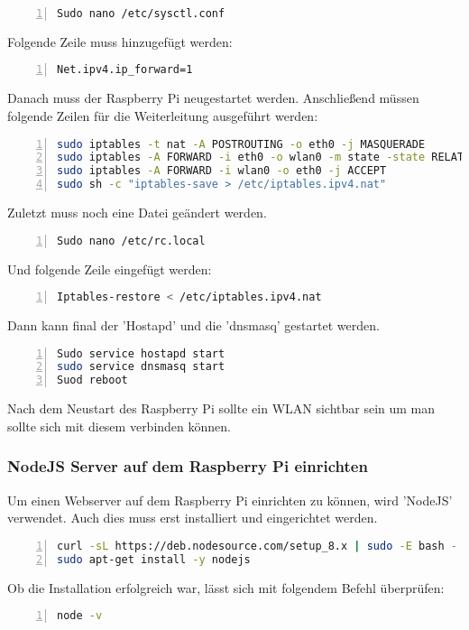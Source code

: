 \begin{lstlisting}[caption={Konfiguration IPV4 Schritt 1}, language={bash}, numbers=left]
Sudo nano /etc/sysctl.conf
\end{lstlisting}
Folgende Zeile muss hinzugefügt werden:
\begin{lstlisting}[caption={Konfiguration IPV4 Schritt 2}, language={bash}, numbers=left]
Net.ipv4.ip_forward=1
\end{lstlisting}
Danach muss der Raspberry Pi neugestartet werden.
Anschließend müssen folgende Zeilen für die Weiterleitung ausgeführt werden:
\begin{lstlisting}[caption={Konfiguration IPV4 Schritt 3}, language={bash}, numbers=left]
sudo iptables -t nat -A POSTROUTING -o eth0 -j MASQUERADE
sudo iptables -A FORWARD -i eth0 -o wlan0 -m state -state RELATED,ESTABLISHED -j ACCEPT
sudo iptables -A FORWARD -i wlan0 -o eth0 -j ACCEPT
sudo sh -c "iptables-save > /etc/iptables.ipv4.nat"
\end{lstlisting}
Zuletzt muss noch eine Datei geändert werden.
\begin{lstlisting}[caption={Konfiguration IPV4 Schritt 4}, language={bash}, numbers=left]
Sudo nano /etc/rc.local
\end{lstlisting}
Und folgende Zeile eingefügt werden:
\begin{lstlisting}[caption={Konfiguration IPV4 Schritt 5}, language={bash}, numbers=left]
Iptables-restore < /etc/iptables.ipv4.nat
\end{lstlisting}
Dann kann final der 'Hostapd' und die 'dnsmasq' gestartet werden.
\begin{lstlisting}[caption={Starten der neu installierten Packages}, language={bash}, numbers=left]
Sudo service hostapd start
sudo service dnsmasq start
Suod reboot
\end{lstlisting}
Nach dem Neustart des Raspberry Pi sollte ein \ac{WLAN} sichtbar sein um man sollte sich mit diesem verbinden können.\cite{raspi1}\cite{raspi2}


\subsubsection{NodeJS Server auf dem Raspberry Pi einrichten}
Um einen Webserver auf dem Raspberry Pi einrichten zu können, wird 'NodeJS' verwendet. Auch dies muss erst installiert und eingerichtet werden.\cite{nodejs}
\begin{lstlisting}[caption={Installation NodeJS Schritt 1}, language={bash}, numbers=left]
curl -sL https://deb.nodesource.com/setup_8.x | sudo -E bash -
sudo apt-get install -y nodejs
\end{lstlisting}
Ob die Installation erfolgreich war, lässt sich mit folgendem Befehl überprüfen:
\begin{lstlisting}[caption={Installation NodeJS Schritt 2}, language={bash}, numbers=left]
node -v
\end{lstlisting}


